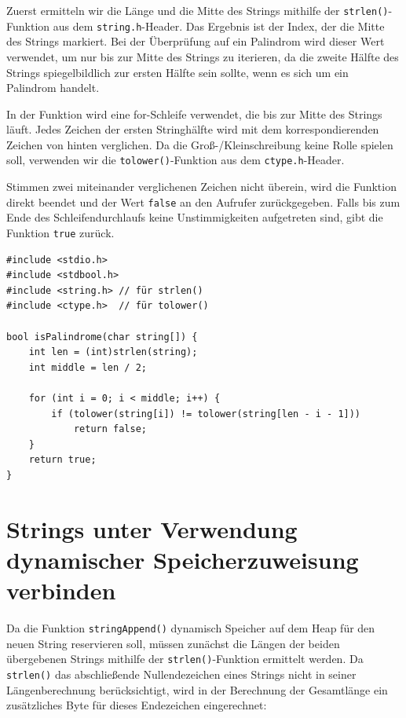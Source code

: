 Zuerst ermitteln wir die Länge und die Mitte des Strings mithilfe der
\texttt{strlen()}-Funktion aus dem \texttt{string.h}-Header. Das
Ergebnis ist der Index, der die Mitte des Strings markiert. Bei der Überprüfung
auf ein Palindrom wird dieser Wert verwendet, um nur bis zur Mitte des Strings
zu iterieren, da die zweite Hälfte des Strings spiegelbildlich zur ersten Hälfte
sein sollte, wenn es sich um ein Palindrom handelt.

In der Funktion wird eine for-Schleife verwendet, die bis zur Mitte des Strings
läuft. Jedes Zeichen der ersten Stringhälfte wird mit dem korrespondierenden
Zeichen von hinten verglichen. Da die Groß-/Kleinschreibung keine Rolle spielen
soll, verwenden wir die \texttt{tolower()}-Funktion aus dem
\texttt{ctype.h}-Header.

Stimmen zwei miteinander verglichenen Zeichen nicht überein, wird die Funktion
direkt beendet und der Wert \texttt{false} an den Aufrufer zurückgegeben.
Falls bis zum Ende des Schleifendurchlaufs keine Unstimmigkeiten aufgetreten
sind, gibt die Funktion \texttt{true} zurück.

\begin{verbatim}
#include <stdio.h>
#include <stdbool.h>
#include <string.h> // für strlen()
#include <ctype.h>  // für tolower()

bool isPalindrome(char string[]) {
    int len = (int)strlen(string);
    int middle = len / 2;

    for (int i = 0; i < middle; i++) {
        if (tolower(string[i]) != tolower(string[len - i - 1]))
            return false;
    }
    return true;
}
\end{verbatim}



\chapter{Strings unter Verwendung dynamischer Speicherzuweisung verbinden}

Da die Funktion \texttt{stringAppend()} dynamisch Speicher auf dem Heap
für den neuen String reservieren soll, müssen zunächst die Längen der beiden
übergebenen Strings mithilfe der \texttt{strlen()}-Funktion ermittelt
werden. Da \texttt{strlen()} das abschließende Nullendezeichen eines
Strings nicht in seiner Längenberechnung berücksichtigt, wird in der Berechnung
der Gesamtlänge ein zusätzliches Byte für dieses Endezeichen eingerechnet:

